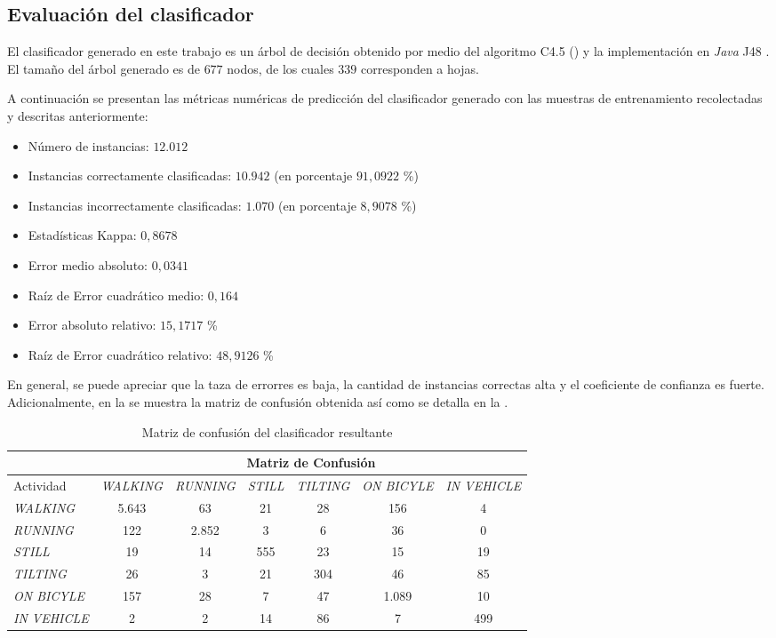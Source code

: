 \subsection{Evaluación del clasificador}

El clasificador generado en este trabajo es un árbol de decisión obtenido
por medio del algoritmo C4.5 () y la implementación
en \emph{Java} J48 \cite{Frank2016b}. El tamaño del árbol generado
es de $677$ nodos, de los cuales $339$ corresponden a hojas.

A continuación se presentan las métricas numéricas de predicción del
clasificador generado con las muestras de entrenamiento recolectadas
y descritas anteriormente: 
\begin{itemize}
\item Número de instancias: $12.012$ 
\item Instancias correctamente clasificadas: $10.942$ (en porcentaje $91,0922$
\%)
\item Instancias incorrectamente clasificadas: $1.070$ (en porcentaje $8,9078$
\%)
\item Estadísticas Kappa: $0,8678$ 
\item Error medio absoluto: $0,0341$
\item Raíz de Error cuadrático medio: $0,164$ 
\item Error absoluto relativo: $15,1717$ \% 
\item Raíz de Error cuadrático relativo: $48,9126$ \% 
\end{itemize}
En general, se puede apreciar que la taza de errorres es baja, la
cantidad de instancias correctas alta y el coeficiente de confianza
es fuerte. Adicionalmente, en la  se
muestra la matriz de confusión obtenida así como se detalla en la
. 

\begin{table}[h]
\begin{centering}
\begin{tabular}{|l|c|c|c|c|c|c|}
\cline{2-7} 
\multicolumn{1}{l|}{} & \multicolumn{6}{c|}{Matriz de Confusión}\tabularnewline
\hline 
Actividad & \emph{\footnotesize{}WALKING} & \emph{\footnotesize{}RUNNING} & \emph{\footnotesize{}STILL} & \emph{\footnotesize{}TILTING} & \emph{\footnotesize{}ON BICYLE} & \emph{\footnotesize{}IN VEHICLE}\tabularnewline
\hline 
\hline 
\emph{\footnotesize{}WALKING} & 5.643 & 63 & 21 & 28 & 156 & 4\tabularnewline
\hline 
\emph{\footnotesize{}RUNNING} & 122 & 2.852 & 3 & 6 & 36 & 0\tabularnewline
\hline 
\emph{\footnotesize{}STILL} & 19 & 14 & 555 & 23 & 15 & 19\tabularnewline
\hline 
\emph{\footnotesize{}TILTING} & 26 & 3 & 21 & 304 & 46 & 85\tabularnewline
\hline 
\emph{\footnotesize{}ON BICYLE} & 157 & 28 & 7 & 47 & 1.089 & 10\tabularnewline
\hline 
\emph{\footnotesize{}IN VEHICLE} & 2 & 2 & 14 & 86 & 7 & 499\tabularnewline
\hline 
\end{tabular}
\par\end{centering}
\caption{\label{tab6:matriz-confusion}Matriz de confusión del clasificador
resultante}
\end{table}

